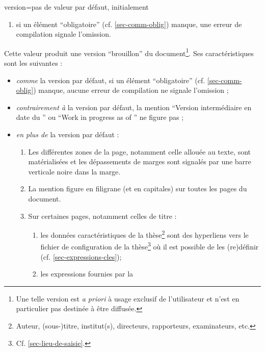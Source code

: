 {\begin{docKey}{version}{=\textbar{}\textbar{}\textbar{}\textbar{}\textbar{}}{pas
      de valeur par défaut, initialement }
\begin{description}
\begin{enumerate}
        \enquote{Version intermédiaire en date du } ou
        \foreignquote{english}{Work in progress as of } est
        désactivé ;
      \item si un élément \enquote{obligatoire} (cf. \vref{sec-comm-oblig})
        manque, une erreur de compilation signale l'omission.
      \end{enumerate}
    \item[\docValue{draft}.]
      Cette valeur produit une version
      \enquote{brouillon} du document\footnote{Une telle version est \emph{a
          priori} à usage exclusif de l'utilisateur et n'est en particulier pas
        destinée à être diffusée.}. Ses caractéristiques sont les suivantes :
      \begin{itemize}
      \item \emph{comme} la version par défaut, si un élément
        \enquote{obligatoire} (cf. \vref{sec-comm-oblig}) manque, aucune erreur
        de compilation ne signale l'omission ;
      \item \emph{contrairement à} la version par défaut, la mention
        \enquote{Version intermédiaire en date du } ou
        \foreignquote{english}{Work in progress as of } ne
        figure pas ;
      \item \emph{en plus de} la version par défaut :
        \begin{enumerate}
        \item Les différentes zones de la page, notamment celle allouée au
          texte, sont matérialisées et les dépassements de marges sont signalés
          par une barre verticale noire dans la marge.
        \item La mention  figure en
          filigrane (et en capitales) sur toutes les pages du
          document.
        \item Sur certaines pages, notamment celles de titre :
          \begin{enumerate}
          \item les données caractéristiques de la thèse\footnote{Auteur,
              (sous-)titre, institut(s), directeurs, rapporteurs, examinateurs,
              etc.} sont des hyperliens vers le fichier de configuration de la
            thèse\footnote{Cf. \vref{sec-lieu-de-saisie}.} où il est possible de
            les (re)définir (cf. \vref{sec-expressions-cles});
          \item\label{item-expression} les expressions fournies par la

\end{enumerate}
\end{enumerate}
\end{itemize}
\end{description}
\end{docKey}}
